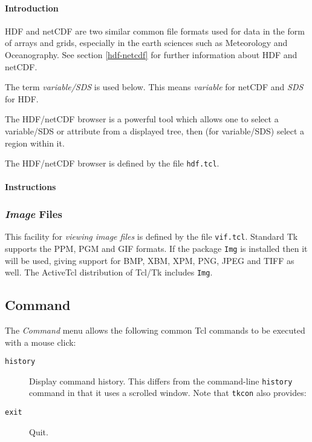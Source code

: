 \paragraph{Introduction \\}
\label{caps-nap-menu-HDF-netCDF-intro}

HDF and netCDF are two similar common file formats used for
data in the form of arrays and grids, especially in the earth
sciences such as Meteorology and Oceanography.
See section \ref{hdf-netcdf} for further information about HDF 
and netCDF.

The term \emph{variable/SDS} is used below.
This means \emph{variable} for netCDF and \emph{SDS} for HDF.

The HDF/netCDF browser is a powerful tool which allows one to
select a variable/SDS or attribute from a displayed tree, then (for
variable/SDS) select a region within it.

The HDF/netCDF browser is defined by the file \texttt{hdf.tcl}.

\paragraph{Instructions}



\subsubsection{\emph{Image} Files}
\label{caps-nap-menu-Image}

    This facility for 
    \emph{viewing image files} is defined by the file 
    \texttt{vif.tcl}. Standard Tk supports the PPM, PGM and GIF
    formats. If the package 
    \texttt{Img} is installed then it will be used, giving support
    for BMP, XBM, XPM, PNG, JPEG and TIFF as well. The ActiveTcl
    distribution of Tcl/Tk includes 
    \texttt{Img}.

\subsection{Command}
    \label{caps-nap-menu-Command}

The 
  \emph{Command} menu allows the following common Tcl commands to be
  executed with a mouse click:
  \begin{description}
    \item[\label{caps-nap-menu-History} \texttt{history}]
    Display command history. This differs from the command-line 
    \texttt{history} command in that it uses a scrolled window.
    Note that 
    \texttt{tkcon} also provides:
    \item[\label{caps-nap-menu-Exit} \texttt{exit}] Quit.
  \end{description}

